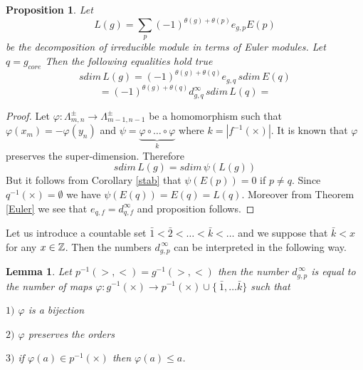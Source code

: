 \documentclass[12pt,reqno]{amsart}
\newtheorem{proposition}[thm]{Proposition}
\newtheorem{lemma}[thm]{Lemma}
\begin{document}
\begin{proposition} Let 
$$
L(g)=\sum_{p}(-1)^{\theta(g)+\theta(p)}e_{g,p}E(p)
$$ 
be the decomposition of irreducible module in terms of Euler modules.  Let $q=g_{core}$   Then the following equalities hold true
$$
sdim\, L(g)=(-1)^{\theta(g)+\theta(q)}e_{g,q}\,sdim\, E(q)
$$
$$
=(-1)^{\theta(g)+\theta(q)}d^{\infty}_{g,q}\,sdim\, L(q)=
$$

\end{proposition}
\begin{proof} Let $\varphi : \Lambda^{\pm}_{m,n}\rightarrow \Lambda^{\pm}_{m-1,n-1} $  be a homomorphism  such that $\varphi(x_m)=-\varphi(y_n)$ and $\psi=\underbrace{\varphi\circ\dots\circ\varphi}_{k}$ where $k=|f^{-1}(\times)|$. It is known that $\varphi$ preserves the super-dimension. Therefore 
$$
sdim\, L(g)=sdim\,\psi( L(g))
$$
But it follows from Corollary \ref{stab} that $\psi(E(p))=0$ if $p\ne q$. Since $q^{-1}(\times)=\emptyset$ we have $\psi(E(q))=E(q)=L(q)$. Moreover
from Theorem \ref{Euler}  we see that $e_{q,f} = d^{\infty}_{q,f}$ and proposition follows.
\end{proof}



Let us introduce  a  countable set $ \bar1<\bar2<\dots<\bar k<\dots$  and we suppose that $\bar k<x$ for any $x\in \Bbb Z$. Then the  numbers $d^{\,\infty}_{g,p}$ can be interpreted in the following way.
\begin{lemma}\label{infty}  Let $p^{-1}(>,<)=g^{-1}(>,<)$  then the  number  $d^{\,\infty}_{g,p}$  is equal to the number of maps $\varphi: g^{-1}(\times)\rightarrow p^{-1}(\times)\cup\{\ \bar1,\dots\bar k\}$ such that 

$1)$ $\varphi $ is a bijection

$2)$ $\varphi $ preserves  the orders

$3)$  if  $\varphi(a) \in p^{-1}(\times)$ then $\varphi(a)\le a$.
\end{lemma}
\end{document}
